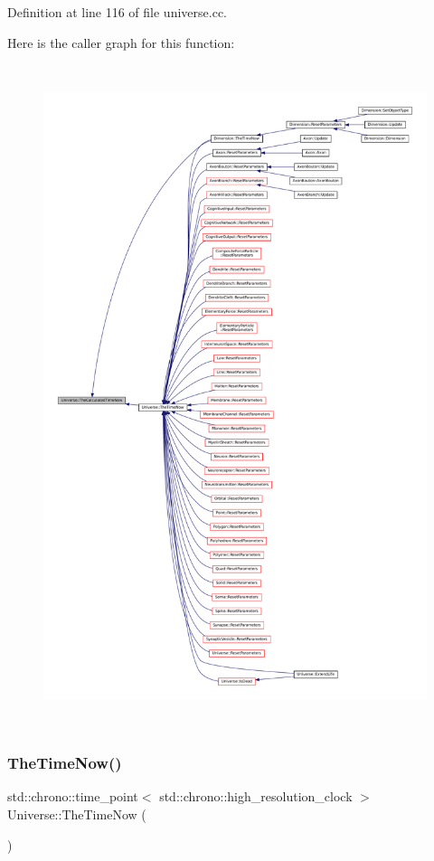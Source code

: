 Definition at line 116 of file universe.\+cc.

Here is the caller graph for this function\+:\nopagebreak
\begin{figure}[H]
\begin{center}
\leavevmode
\includegraphics[height=550pt]{class_universe_aa220508c4cc12b02c6fe494622ebb58d_icgraph}
\end{center}
\end{figure}
\mbox{\label{class_universe_ae54d34c5d695917e074b8e07e8820bdb}} 
\subsubsection{\texorpdfstring{The\+Time\+Now()}{TheTimeNow()}}
{\footnotesize\ttfamily std\+::chrono\+::time\+\_\+point$<$ std\+::chrono\+::high\+\_\+resolution\+\_\+clock $>$ Universe\+::\+The\+Time\+Now (\begin{DoxyParamCaption}{ }\end{DoxyParamCaption})}



